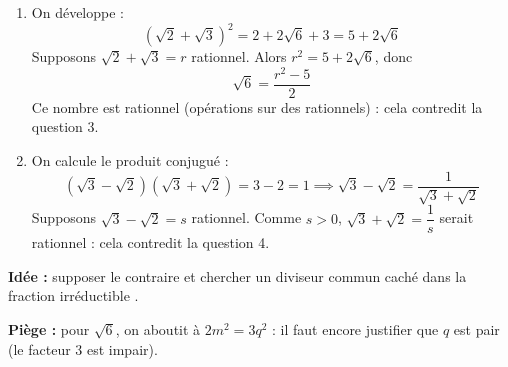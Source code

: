\documentclass[12pt,a4paper]{article}
\begin{document}
\begin{corr}[title={Racines irrationnelles}, stars=4]
\begin{enumerate}
  On remplace : $4m^2=6q^2$, soit
  \[2m^2=3q^2\]
  Le nombre $3q^2$ est pair. Si $q^2$ était impair, $3q^2$ serait un produit de deux impairs, donc impair : c'est faux. Donc $q^2$ est pair, et $q$ est pair.

  $p$ et $q$ sont pairs : contradiction. 

  \item On développe :
  \[(\sqrt2+\sqrt3)^2=2+2\sqrt6+3=5+2\sqrt6\]
  Supposons $\sqrt2+\sqrt3=r$ rationnel. Alors $r^2=5+2\sqrt6$, donc
  \[\sqrt6=\dfrac{r^2-5}2\]
  Ce nombre est rationnel (opérations sur des rationnels) : cela contredit la question 3.


  \item On calcule le produit conjugué :
  \[(\sqrt3-\sqrt2)(\sqrt3+\sqrt2)=3-2=1\implies\sqrt3-\sqrt2=\dfrac1{\sqrt3+\sqrt2}\]
  Supposons $\sqrt3-\sqrt2=s$ rationnel. Comme $s>0$, $\sqrt3+\sqrt2=\dfrac1s$ serait rationnel : cela contredit la question 4.

\end{enumerate}
\textbf{Idée :} supposer le contraire et chercher un diviseur commun caché dans la fraction \og irréductible \fg{}.

\textbf{Piège :} pour $\sqrt6$, on aboutit à $2m^2=3q^2$ : il faut encore justifier que $q$ est pair (le facteur $3$ est impair).
\end{corr}
\end{document}
